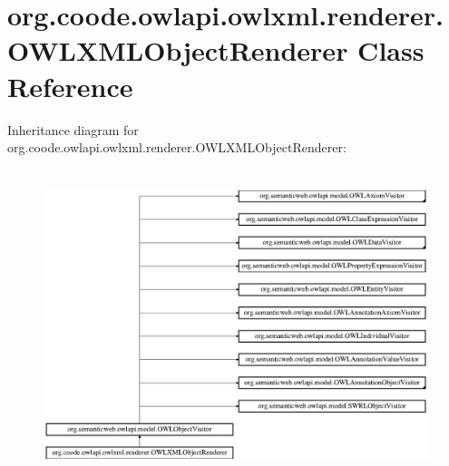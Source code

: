 \hypertarget{classorg_1_1coode_1_1owlapi_1_1owlxml_1_1renderer_1_1_o_w_l_x_m_l_object_renderer}{\section{org.\-coode.\-owlapi.\-owlxml.\-renderer.\-O\-W\-L\-X\-M\-L\-Object\-Renderer Class Reference}
\label{classorg_1_1coode_1_1owlapi_1_1owlxml_1_1renderer_1_1_o_w_l_x_m_l_object_renderer}
}
Inheritance diagram for org.\-coode.\-owlapi.\-owlxml.\-renderer.\-O\-W\-L\-X\-M\-L\-Object\-Renderer\-:\begin{figure}[H]
\begin{center}
\leavevmode
\includegraphics[height=9.056604cm]{classorg_1_1coode_1_1owlapi_1_1owlxml_1_1renderer_1_1_o_w_l_x_m_l_object_renderer}
\end{center}
\end{figure}
